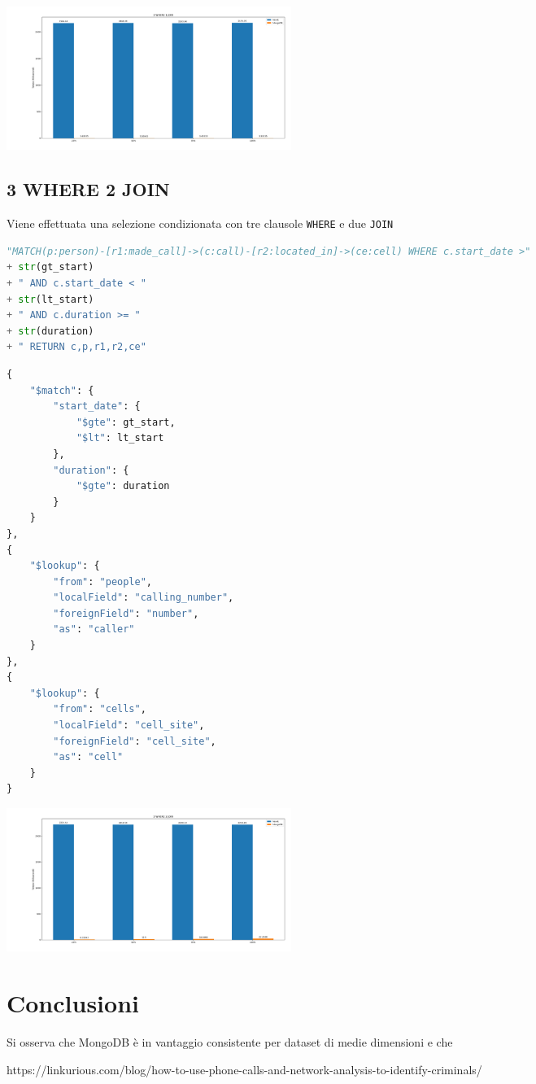     \includegraphics[width=350px, keepaspectratio]{query3.png}

    \pagebreak
    \subsection{3 WHERE 2 JOIN}
    Viene effettuata una selezione condizionata con tre clausole \texttt{WHERE}
    e due \texttt{JOIN}

    \begin{lstlisting}[language=Python, caption=Neo4j]
"MATCH(p:person)-[r1:made_call]->(c:call)-[r2:located_in]->(ce:cell) WHERE c.start_date >" 
+ str(gt_start) 
+ " AND c.start_date < " 
+ str(lt_start) 
+ " AND c.duration >= " 
+ str(duration) 
+ " RETURN c,p,r1,r2,ce"
    \end{lstlisting}


    \begin{lstlisting}[language=Python, caption=MongoDB]
{
    "$match": {
        "start_date": {
            "$gte": gt_start,
            "$lt": lt_start
        },
        "duration": {
            "$gte": duration
        }
    }
},
{
    "$lookup": {
        "from": "people",
        "localField": "calling_number",
        "foreignField": "number",
        "as": "caller"
    }
},
{
    "$lookup": {
        "from": "cells",
        "localField": "cell_site",
        "foreignField": "cell_site",
        "as": "cell"
    }
}
    \end{lstlisting}
    \includegraphics[width=350px, keepaspectratio]{query4.png}


\section{Conclusioni}
Si osserva che MongoDB è in vantaggio consistente per dataset di medie dimensioni e che 


\begin{thebibliography}{1}
 https://linkurious.com/blog/how-to-use-phone-calls-and-network-analysis-to-identify-criminals/
\end{thebibliography}

